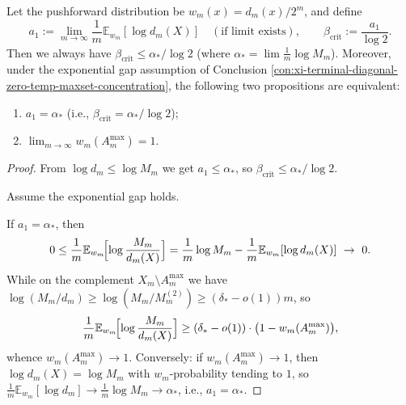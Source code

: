 \begin{conclusion}[\texorpdfstring{$\beta_{\mathrm{crit}}=\alpha_\ast/\log 2$}{beta_crit=alpha*/log2} discriminant: if and only if the pushforward \texorpdfstring{$w_m$}{w_m} freezes to the maximal fiber set at exponential scale]\label{con:xi-terminal-typical-extreme-coaxial-freeze-criterion}
Let the pushforward distribution be \(w_m(x)=d_m(x)/2^m\), and define
\[
a_1:=\lim_{m\to\infty}\frac{1}{m}\mathbb E_{w_m}[\log d_m(X)]\quad(\text{if limit exists}),
\qquad
\beta_{\mathrm{crit}}:=\frac{a_1}{\log2}.
\]
Then we always have \(\beta_{\mathrm{crit}}\le \alpha_\ast/\log2\) (where \(\alpha_\ast=\lim\frac{1}{m}\log M_m\)).
Moreover, under the exponential gap assumption of Conclusion \ref{con:xi-terminal-diagonal-zero-temp-maxset-concentration},
the following two propositions are equivalent:
\begin{enumerate}
  \item \(a_1=\alpha_\ast\) (i.e., \(\beta_{\mathrm{crit}}=\alpha_\ast/\log2\));
  \item \(\lim_{m\to\infty} w_m(A_m^{\max})=1\).
\end{enumerate}
\end{conclusion}
\begin{proof}
From \(\log d_m\le \log M_m\) we get \(a_1\le \alpha_\ast\), so \(\beta_{\mathrm{crit}}\le \alpha_\ast/\log2\).

\par
Assume the exponential gap holds.

If \(a_1=\alpha_\ast\), then
\[
0\le \frac{1}{m}\mathbb E_{w_m}\!\Bigl[\log\frac{M_m}{d_m(X)}\Bigr]
=\frac{1}{m}\log M_m-\frac{1}{m}\mathbb E_{w_m}[\log d_m(X)]\ \to\ 0.
\]
While on the complement \(X_m\setminus A_m^{\max}\) we have \(\log(M_m/d_m)\ge \log(M_m/M_m^{(2)})\ge (\delta_\ast-o(1))m\),
so
\[
\frac{1}{m}\mathbb E_{w_m}\!\Bigl[\log\frac{M_m}{d_m(X)}\Bigr]
\ge (\delta_\ast-o(1))\cdot\bigl(1-w_m(A_m^{\max})\bigr),
\]
whence \(w_m(A_m^{\max})\to 1\).
Conversely: if \(w_m(A_m^{\max})\to 1\), then \(\log d_m(X)=\log M_m\) with \(w_m\)-probability tending to \(1\),
so \(\frac1m\mathbb E_{w_m}[\log d_m]\to \frac1m\log M_m\to\alpha_\ast\), i.e., \(a_1=\alpha_\ast\).
\end{proof}

